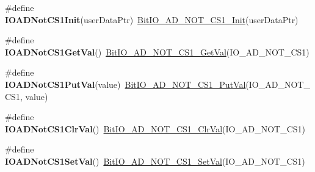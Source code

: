 \begin{DoxyCompactItemize}
\item 
\hypertarget{group___func_ala_ga7df74f544d0e760216431c9d9aed2689}{\#define {\bfseries I\-O\-A\-D\-Not\-C\-S1\-Init}(user\-Data\-Ptr)~\hyperlink{group___bit_i_o___a_d___n_o_t___c_s1__module_gab85945d69adf4f40df7adad1818690df}{Bit\-I\-O\-\_\-\-A\-D\-\_\-\-N\-O\-T\-\_\-\-C\-S1\-\_\-\-Init}(user\-Data\-Ptr)}\label{group___func_ala_ga7df74f544d0e760216431c9d9aed2689}

\item 
\hypertarget{group___func_ala_gae16c977e6ffc85314a8775bc0f7d8f2d}{\#define {\bfseries I\-O\-A\-D\-Not\-C\-S1\-Get\-Val}()~\hyperlink{group___bit_i_o___a_d___n_o_t___c_s1__module_ga73cf41b12e8731f899465fad778a0794}{Bit\-I\-O\-\_\-\-A\-D\-\_\-\-N\-O\-T\-\_\-\-C\-S1\-\_\-\-Get\-Val}(I\-O\-\_\-\-A\-D\-\_\-\-N\-O\-T\-\_\-\-C\-S1)}\label{group___func_ala_gae16c977e6ffc85314a8775bc0f7d8f2d}

\item 
\hypertarget{group___func_ala_gaba2cbe80e03eff29c586c1b13fcd2ef9}{\#define {\bfseries I\-O\-A\-D\-Not\-C\-S1\-Put\-Val}(value)~\hyperlink{group___bit_i_o___a_d___n_o_t___c_s1__module_ga81e2e5affe80ba7b2fb99fa088dab790}{Bit\-I\-O\-\_\-\-A\-D\-\_\-\-N\-O\-T\-\_\-\-C\-S1\-\_\-\-Put\-Val}(I\-O\-\_\-\-A\-D\-\_\-\-N\-O\-T\-\_\-\-C\-S1, value)}\label{group___func_ala_gaba2cbe80e03eff29c586c1b13fcd2ef9}

\item 
\hypertarget{group___func_ala_gaf3ea899383c7f3d9f9bec8088ed4f415}{\#define {\bfseries I\-O\-A\-D\-Not\-C\-S1\-Clr\-Val}()~\hyperlink{group___bit_i_o___a_d___n_o_t___c_s1__module_gadad3d876c08eca49edfa6e2cfb6fc48b}{Bit\-I\-O\-\_\-\-A\-D\-\_\-\-N\-O\-T\-\_\-\-C\-S1\-\_\-\-Clr\-Val}(I\-O\-\_\-\-A\-D\-\_\-\-N\-O\-T\-\_\-\-C\-S1)}\label{group___func_ala_gaf3ea899383c7f3d9f9bec8088ed4f415}

\item 
\hypertarget{group___func_ala_gab48e3ef8a757c1787d86e093547db999}{\#define {\bfseries I\-O\-A\-D\-Not\-C\-S1\-Set\-Val}()~\hyperlink{group___bit_i_o___a_d___n_o_t___c_s1__module_ga414991c8e2303a9daf8aac6ed7618b22}{Bit\-I\-O\-\_\-\-A\-D\-\_\-\-N\-O\-T\-\_\-\-C\-S1\-\_\-\-Set\-Val}(I\-O\-\_\-\-A\-D\-\_\-\-N\-O\-T\-\_\-\-C\-S1)}\label{group___func_ala_gab48e3ef8a757c1787d86e093547db999}

\end{DoxyCompactItemize}
